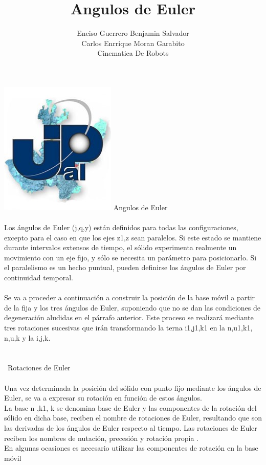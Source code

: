 \documentclass[12pt,a4paper]{article}
\author{Enciso Guerrero Benjamin Salvador\\
Carlos Enrrique Moran Garabito\\
Cinematica De Robots }
\title{Angulos de Euler}
\begin{document}
\maketitle
\includegraphics[scale=1.8]   {upzmgg.jpg}
\newpage
Angulos de Euler\\\\
Los ángulos de Euler (j,q,y) están definidos para todas las configuraciones, excepto para el caso en que los ejes z1,z sean paralelos. Si este estado se mantiene durante intervalos extensos de tiempo, el sólido experimenta realmente un movimiento con un eje fijo, y sólo se necesita un parámetro para posicionarlo. Si el paralelismo es un hecho puntual, pueden definirse los ángulos de Euler por continuidad temporal.\\\\Se va a proceder a continuación a construir la posición de la base móvil a partir de la fija y los tres ángulos de Euler, suponiendo que no se dan las condiciones de degeneración aludidas en el párrafo anterior. Este proceso se realizará mediante tres rotaciones sucesivas que irán transformando la terna {i1,j1,k1} en la {n,u1,k1}, {n,u,k} y la {i,j,k}.\\\\\\\
Rotaciones de Euler\\\\
Una vez determinada la posición del sólido con punto fijo mediante los ángulos de Euler, se va a expresar su rotación en función de estos ángulos.\\
La base {n ,k1, k} se denomina base de Euler y las componentes de la rotación del sólido en dicha base, reciben el nombre de rotaciones de Euler, resultando que son las derivadas de los ángulos de Euler respecto al tiempo.
Las rotaciones de Euler  reciben los nombres de nutación, precesión y rotación propia .\\
En algunas ocasiones es necesario utilizar las componentes de rotación en la base móvil\\\\
\end{document}
